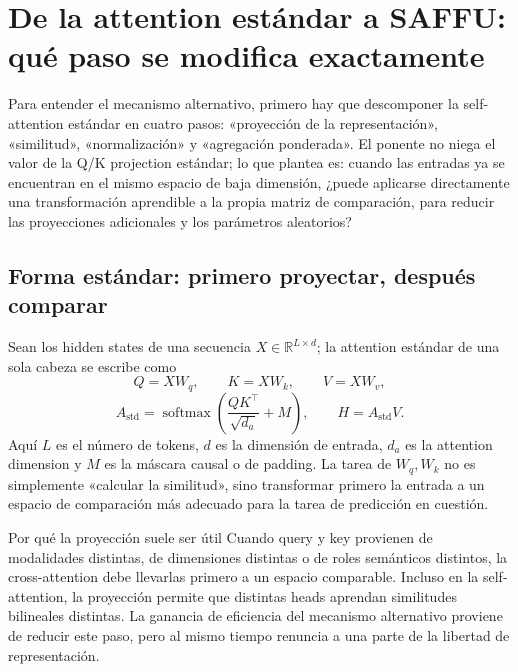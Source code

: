 \section{De la attention estándar a SAFFU: qué paso se modifica exactamente}

Para entender el mecanismo alternativo, primero hay que descomponer la self-attention estándar en cuatro pasos: «proyección de la representación», «similitud», «normalización» y «agregación ponderada». El ponente no niega el valor de la Q/K projection estándar; lo que plantea es: cuando las entradas ya se encuentran en el mismo espacio de baja dimensión, ¿puede aplicarse directamente una transformación aprendible a la propia matriz de comparación, para reducir las proyecciones adicionales y los parámetros aleatorios?

\subsection{Forma estándar: primero proyectar, después comparar}

Sean los hidden states de una secuencia $X\in\mathbb{R}^{L\times d}$; la attention estándar de una sola cabeza se escribe como
\[
Q=XW_q,\qquad K=XW_k,\qquad V=XW_v,
\]
\[
A_{\text{std}}=\operatorname{softmax}\!\left(\frac{QK^\top}{\sqrt{d_a}}+M\right),
\qquad H=A_{\text{std}}V.
\]
Aquí $L$ es el número de tokens, $d$ es la dimensión de entrada, $d_a$ es la attention dimension y $M$ es la máscara causal o de padding. La tarea de $W_q,W_k$ no es simplemente «calcular la similitud», sino transformar primero la entrada a un espacio de comparación más adecuado para la tarea de predicción en cuestión.

\begin{knowledgebox}{Por qué la proyección suele ser útil}
Cuando query y key provienen de modalidades distintas, de dimensiones distintas o de roles semánticos distintos, la cross-attention debe llevarlas primero a un espacio comparable. Incluso en la self-attention, la proyección permite que distintas heads aprendan similitudes bilineales distintas. La ganancia de eficiencia del mecanismo alternativo proviene de reducir este paso, pero al mismo tiempo renuncia a una parte de la libertad de representación.
\end{knowledgebox}


